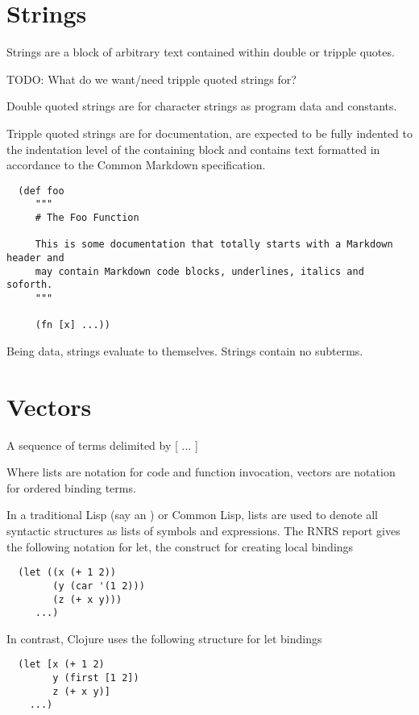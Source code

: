 \documentclass{report}
\def\rnrs{RNRS }
\begin{document}
\section{Strings}


Strings are a block of arbitrary text contained within double or tripple quotes.

TODO: What do we want/need tripple quoted strings for?

Double quoted strings are for character strings as program data and constants.

Tripple quoted strings are for documentation, are expected to be fully
indented to the indentation level of the containing block and contains text
formatted in accordance to the Common Markdown specification.

\begin{lstlisting}
  (def foo
     """
     # The Foo Function
   
     This is some documentation that totally starts with a Markdown header and
     may contain Markdown code blocks, underlines, italics and soforth.
     """
   
     (fn [x] ...))
\end{lstlisting}

Being data, strings evaluate to themselves. Strings contain no subterms.

\section{Vectors}


A sequence of terms delimited by [ ... ]

Where lists are notation for code and function invocation, vectors are
notation for ordered binding terms.

In a traditional Lisp (say an ) or Common Lisp, lists are used to
denote all syntactic structures as lists of symbols and expressions. The
\rnrs report gives the following notation for let, the construct for
creating local bindings

\begin{lstlisting}
  (let ((x (+ 1 2))
        (y (car '(1 2)))
        (z (+ x y)))
     ...)
\end{lstlisting}

In contrast, Clojure uses the following structure for let bindings

\begin{lstlisting}
  (let [x (+ 1 2)
        y (first [1 2])
        z (+ x y)]
    ...)
\end{lstlisting}
\end{document}
